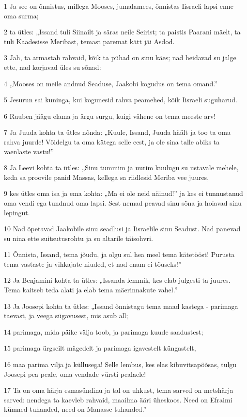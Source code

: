 \par 1 Ja see on õnnistus, millega Mooses, jumalamees, õnnistas Iisraeli lapsi enne oma surma;
\par 2 ta ütles: „Issand tuli Siinailt ja säras neile Seirist; ta paistis Paarani mäelt, ta tuli Kaadesisse Meribast, temast paremat kätt jäi Asdod.
\par 3 Jah, ta armastab rahvaid, kõik ta pühad on sinu käes; nad heidavad su jalge ette, nad korjavad üles su sõnad:
\par 4 „Mooses on meile andnud Seaduse, Jaakobi kogudus on tema omand.”
\par 5 Jesurun sai kuninga, kui kogunesid rahva peamehed, kõik Iisraeli suguharud.
\par 6 Ruuben jäägu elama ja ärgu surgu, kuigi vähene on tema meeste arv!
\par 7 Ja Juuda kohta ta ütles nõnda: „Kuule, Issand, Juuda häält ja too ta oma rahva juurde! Võidelgu ta oma kätega selle eest, ja ole sina talle abiks ta vaenlaste vastu!”
\par 8 Ja Leevi kohta ta ütles: „Sinu tummim ja uurim kuulugu su ustavale mehele, keda sa proovile panid Massas, kellega sa riidlesid Meriba vee juures,
\par 9 kes ütles oma isa ja ema kohta: „Ma ei ole neid näinud!” ja kes ei tunnustanud oma vendi ega tundnud oma lapsi. Sest nemad peavad sinu sõna ja hoiavad sinu lepingut.
\par 10 Nad õpetavad Jaakobile sinu seadlusi ja Iisraelile sinu Seadust. Nad panevad su nina ette suitsutusrohtu ja su altarile täisohvri.
\par 11 Õnnista, Issand, tema jõudu, ja olgu sul hea meel tema kätetööst! Purusta tema vastaste ja vihkajate niuded, et nad enam ei tõuseks!”
\par 12 Ja Benjamini kohta ta ütles: „Issanda lemmik, kes elab julgesti ta juures. Tema kaitseb teda alati ja elab tema mäerinnakute vahel.”
\par 13 Ja Joosepi kohta ta ütles: „Issand õnnistagu tema maad kastega - parimaga taevast, ja veega sügavusest, mis asub all;
\par 14 parimaga, mida päike välja toob, ja parimaga kuude saadustest;
\par 15 parimaga ürgseilt mägedelt ja parimaga igavestelt küngastelt,
\par 16 maa parima vilja ja küllusega! Selle lembus, kes elas kibuvitsapõõsas, tulgu Joosepi pea peale, oma vendade vürsti pealaele!
\par 17 Ta on oma härja esmasündinu ja tal on uhkust, tema sarved on metshärja sarved: nendega ta kaevleb rahvaid, maailma ääri üheskoos. Need on Efraimi kümned tuhanded, need on Manasse tuhanded.”
